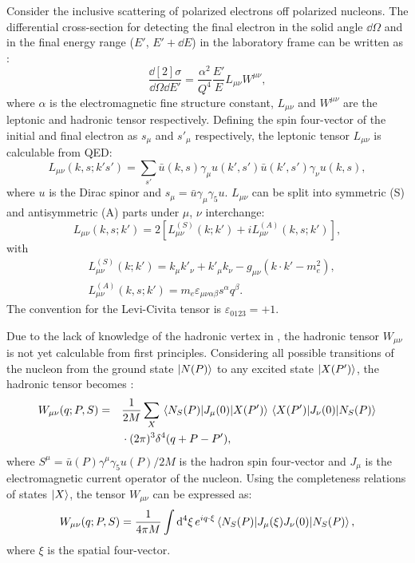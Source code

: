 Consider the inclusive scattering of polarized electrons off polarized nucleons. The differential cross-section for detecting the final electron in the solid angle $\dd{\Omega}$ and in the final energy range ($E'$, $E'+\dd{E}$) in the laboratory frame can be written as \cite{Leader1996}:
\begin{equation} \label{C2S2E1}
\frac{\dd[2]{\sigma}}{\dd{\Omega}\dd{E'}} = \frac{\alpha^2}{Q^4}\frac{E'}{E}L_{\mu\nu}W^{\mu\nu},
\end{equation}
where $\alpha$ is the electromagnetic fine structure constant, $L_{\mu\nu}$ and $W^{\mu\nu}$ are the leptonic and hadronic tensor respectively. Defining the spin four-vector of the initial and final electron as $s_\mu$ and $s'_\mu$ respectively, the leptonic tensor $L_{\mu\nu}$ is calculable from QED:
\begin{equation} \label{C2S2E2}
L_{\mu\nu}(k,s;k's') = \sum_{s'}\bar{u}(k,s)\gamma_\mu u(k',s')\bar{u}(k',s')\gamma_\nu u(k,s),
\end{equation}
where $u$ is the Dirac spinor and $s_\mu=\bar{u}\gamma_\mu\gamma_5 u$. $L_{\mu\nu}$ can be split into symmetric (S) and antisymmetric (A) parts under $\mu$, $\nu$ interchange:
\begin{equation} \label{C2S2E3}
L_{\mu\nu}(k,s;k') = 2[L_{\mu\nu}^{(S)}(k;k') + iL_{\mu\nu}^{(A)}(k,s;k')],
\end{equation}
with
\begin{align} \label{C2S2E4}
& L_{\mu\nu}^{(S)}(k;k') = k_\mu k'_\nu+k'_\mu k_\nu-g_{\mu\nu}(k\cdot k'-m_e^2), \\ \label{C2S2E5}
& L_{\mu\nu}^{(A)}(k,s;k') = m_e\varepsilon_{\mu\nu\alpha\beta}s^\alpha q^\beta.
\end{align}
The convention for the Levi-Civita tensor is $\varepsilon_{0123}=+1$.

Due to the lack of knowledge of the hadronic vertex in , the hadronic tensor $W_{\mu\nu}$ is not yet calculable from first principles. Considering all possible transitions of the nucleon from the ground state $\ket{N(P)}$ to any excited state $\ket{X(P')}$, the hadronic tensor becomes \cite{Thomas2001}:
\begin{equation} \label{C2S2E6}
\begin{split}
W_{\mu\nu}(q;P,S) = \quad & \frac{1}{2M}\sum_X\mel{N_S(P)}{J_\mu(0)}{X(P')}\mel{X(P')}{J_\nu(0)}{N_S(P)} \\
& \cdot(2\pi)^3\delta^4(q+P-P'),
\end{split}
\end{equation}
where $S^\mu=\bar{u}(P)\gamma^\mu\gamma_5u(P)/2M$ is the hadron spin four-vector and $J_\mu$ is the electromagnetic current operator of the nucleon. Using the completeness relations of states $\ket{X}$, the tensor $W_{\mu\nu}$ can be expressed as:
\begin{equation} \label{C2S2E7}
W_{\mu\nu}(q;P,S) = \frac{1}{4\pi M}\int\dd[4]{\xi}e^{iq\cdot\xi}\mel{N_S(P)}{J_\mu(\xi)J_\nu(0)}{N_S(P)},
\end{equation}
where $\xi$ is the spatial four-vector.

